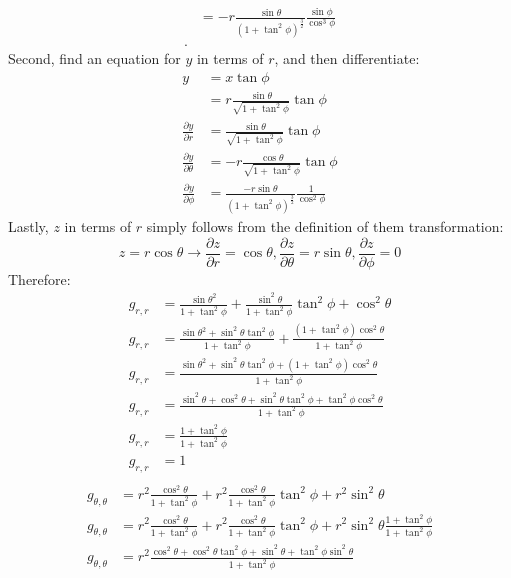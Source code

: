 \documentclass[a4paper]{article}
\begin{document}
\begin{enumerate}
\[\begin{align*}
      &=-r\frac{\sin\theta}{(1+\tan^2\phi)^{\frac{3}{2}}}\frac{\sin\phi}{\cos^3\phi} \\
    .\end{align*}
  \]
  Second, find an equation for $y$ in terms of $r$, and then differentiate:
  \[
  \begin{align*}
    y&= x \tan\phi\\
     &= r\frac{\sin\theta}{\sqrt{1+\tan^2\phi}} \tan\phi \\
    \frac{\partial y}{\partial r}  &= \frac{\sin\theta}{\sqrt{1+\tan^2\phi}}\tan\phi\\
    \frac{\partial y}{\partial \theta}  &= -r\frac{\cos\theta}{\sqrt{1+\tan^2\phi}} \tan\phi \\
    \frac{\partial y}{\partial \phi}  &= \frac{-r\sin\theta}{(1+\tan^2\phi)^\frac{3}{2}}\frac{1}{\cos^2\phi}
  \end{align*}
  \]
  Lastly, $z$ in terms of $r$ simply follows from the definition of them
  transformation:
  \[
  z = r\cos\theta \to \frac{\partial z}{\partial r} = \cos\theta,
      \frac{\partial z}{\partial \theta} = r \sin\theta,
      \frac{\partial z}{\partial \phi} = 0
  \]
  Therefore:
  \[
    \begin{align*}
      g_{r,r}&=\frac{\sin\theta^2}{1+\tan^2\phi} + \frac{\sin^2\theta}{1+\tan^2\phi}\tan^2\phi + \cos^2\theta\\
      g_{r,r}&=\frac{\sin\theta^2 + \sin^2\theta\tan^2\phi}{1+\tan^2\phi} +\frac{(1+\tan^2\phi)\cos^2\theta}{1+\tan^2\phi}\\
      g_{r,r}&=\frac{\sin\theta^2 + \sin^2\theta\tan^2\phi+(1+\tan^2\phi)\cos^2\theta}{1+\tan^2\phi}\\
      g_{r,r}&=\frac{\sin^2\theta + \cos^2\theta+\sin^2\theta\tan^2\phi+\tan^2\phi\cos^2\theta}{1+\tan^2\phi}\\
      g_{r,r}&=\frac{1+\tan^2\phi}{1+\tan^2\phi}\\
      g_{r,r}&=1\\
    \end{align*}
  \]
  \[
    \begin{align*}
      g_{\theta,\theta}&=
      r^2 \frac{\cos^2\theta}{1+\tan^2\phi}+
      r^2 \frac{\cos^2\theta}{1+\tan^2\phi}\tan^2\phi
      + r^2\sin^2\theta\\
      g_{\theta,\theta}&=
      r^2 \frac{\cos^2\theta}{1+\tan^2\phi}+
      r^2 \frac{\cos^2\theta}{1+\tan^2\phi}\tan^2\phi
      + r^2\sin^2\theta\frac{1+\tan^2\phi}{1+\tan^2\phi}\\
      g_{\theta,\theta}&=
      r^2 \frac{\cos^2\theta+\cos^2\theta\tan^2\phi+\sin^2\theta+\tan^2\phi\sin^2\theta}{1+\tan^2\phi}\\

\end{align*}\]
\end{enumerate}
\end{document}
